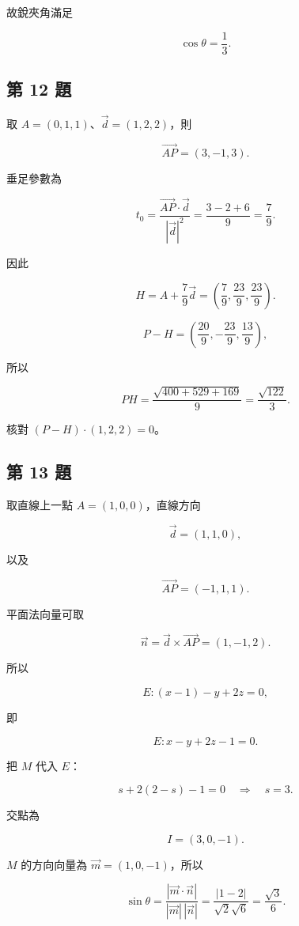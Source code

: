 \documentclass[11pt,a4paper]{article}
\begin{document}
故銳夾角滿足

\[
\boxed{\cos\theta=\frac13}.
\]

\subsection{第 12 題}\label{ux7b2c-12-ux984c}

取 \(A=(0,1,1)\)、\(\vec d=(1,2,2)\)，則

\[
\overrightarrow{AP}=(3,-1,3).
\]

垂足參數為

\[
t_0
=\frac{\overrightarrow{AP}\cdot\vec d}{|\vec d|^2}
=\frac{3-2+6}{9}
=\frac79.
\]

因此

\[
H=A+\frac79\vec d
=\boxed{\left(\frac79,\frac{23}{9},\frac{23}{9}\right)}.
\]

\[
P-H
=\left(\frac{20}{9},-\frac{23}{9},\frac{13}{9}\right),
\]

所以

\[
PH
=\frac{\sqrt{400+529+169}}9
=\boxed{\frac{\sqrt{122}}3}.
\]

核對 \((P-H)\cdot(1,2,2)=0\)。

\subsection{第 13 題}\label{ux7b2c-13-ux984c}

取直線上一點 \(A=(1,0,0)\)，直線方向

\[
\vec d=(1,1,0),
\]

以及

\[
\overrightarrow{AP}=(-1,1,1).
\]

平面法向量可取

\[
\vec n
=\vec d\times\overrightarrow{AP}
=(1,-1,2).
\]

所以

\[
E:(x-1)-y+2z=0,
\]

即

\[
\boxed{E:x-y+2z-1=0}.
\]

把 \(M\) 代入 \(E\)：

\[
s+2(2-s)-1=0
\quad\Longrightarrow\quad s=3.
\]

交點為

\[
\boxed{I=(3,0,-1)}.
\]

\(M\) 的方向向量為 \(\vec m=(1,0,-1)\)，所以

\[
\sin\theta
=\frac{|\vec m\cdot\vec n|}{|\vec m|\,|\vec n|}
=\frac{|1-2|}{\sqrt2\sqrt6}
=\boxed{\frac{\sqrt3}{6}}.
\]
\end{document}
